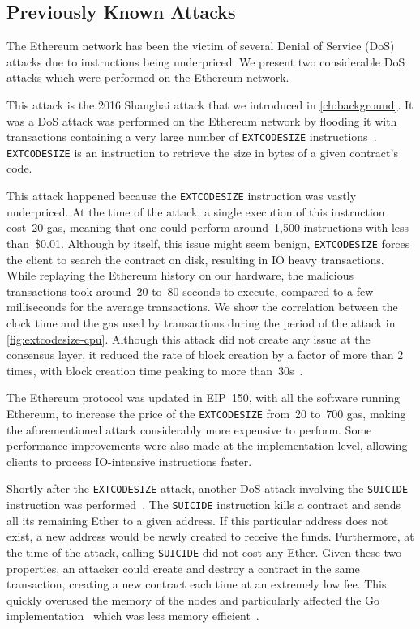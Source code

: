 \subsection{Previously Known Attacks}
The Ethereum network has been the victim of several Denial of Service (DoS) attacks due to instructions being underpriced. We present two considerable DoS attacks which were performed on the Ethereum network.

This attack is the 2016 Shanghai attack that we introduced in \autoref{ch:background}.
It was a DoS attack was performed on the Ethereum network by flooding it with transactions containing a very large number of \lstinline{EXTCODESIZE} instructions~\cite{transaction-spam-attack}.
\lstinline{EXTCODESIZE} is an instruction to retrieve the size in bytes of a given contract's code.

This attack happened because the \lstinline{EXTCODESIZE} instruction was vastly underpriced.
At the time of the attack, a single execution of this instruction cost~20 gas, meaning that one could perform around~1,500 instructions with less than~\$0.01.
Although by itself, this issue might seem benign, \lstinline{EXTCODESIZE} forces the client to search the contract on disk, resulting in IO heavy transactions.
While replaying the Ethereum history on our hardware, the malicious transactions took around~20 to~80 seconds to execute, compared to a few milliseconds for the average transactions. We show the correlation between the clock time and the gas used by transactions during the period of the attack in \autoref{fig:extcodesize-cpu}.
Although this attack did not create any issue at the consensus layer, it reduced the rate of block creation by a factor of more than 2 times, with block creation time peaking to more than~30s~\cite{block-time-chart}.

The Ethereum protocol was updated in EIP~150, with all the software running Ethereum, to increase the price of the \lstinline{EXTCODESIZE} from~20 to~700 gas, making the aforementioned attack considerably more expensive to perform. Some performance improvements were also made at the implementation level, allowing clients to process IO-intensive instructions faster.

Shortly after the \lstinline{EXTCODESIZE} attack, another DoS attack involving the \lstinline{SUICIDE} instruction was performed~\cite{suicide-attack}. The \lstinline{SUICIDE} instruction kills a contract and sends all its remaining Ether to a given address. If this particular address does not exist, a new address would be newly created to receive the funds. Furthermore, at the time of the attack, calling \lstinline{SUICIDE} did not cost any Ether. Given these two properties, an attacker could create and destroy a contract in the same transaction, creating a new contract each time at an extremely low fee. This quickly overused the memory of the nodes and particularly affected the Go implementation~\cite{geth} which was less memory efficient~\cite{geth-memory-efficiency}.


